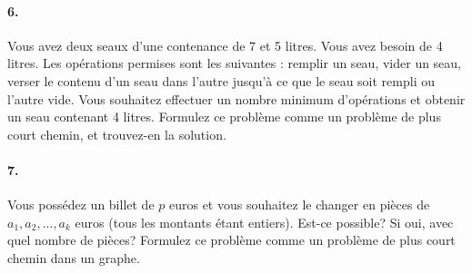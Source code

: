 \begin{center}
\end{center}



\newpage



\paragraph{6. } Vous avez deux seaux d'une contenance de 7 et 5 litres. Vous avez besoin de 4 litres. Les opérations permises sont les suivantes : remplir un seau, vider un seau, verser le contenu d'un seau dans l'autre jusqu'à ce que le seau soit rempli ou l'autre vide. Vous souhaitez effectuer un nombre minimum d'opérations et obtenir un seau contenant 4 litres. Formulez ce problème comme un problème de plus court chemin, et trouvez-en la solution.

\paragraph{7. } Vous possédez un billet de $p$ euros et vous souhaitez le changer en pièces de $a_1, a_2, ..., a_k$ euros (tous les montants étant entiers). Est-ce possible? Si oui, avec quel nombre de pièces? Formulez ce problème comme un problème de plus court chemin dans un graphe.
